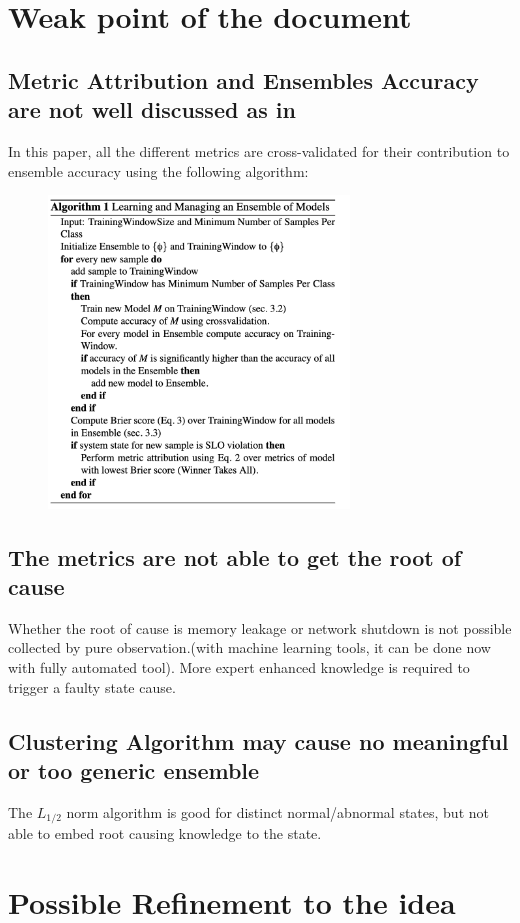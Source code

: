 \documentclass[acmlarge]{acmart}
\begin{document}
\section{Weak point of the document}
\subsection{Metric Attribution and Ensembles Accuracy are not well discussed as in \cite{zhang2005ensembles}}
In this paper, all the different metrics are cross-validated for their contribution to ensemble accuracy using the following algorithm:

\begin{figure}[htbp]
  \centering
  \includegraphics[width=8cm]{./cross_validate.png}
\end{figure}
\subsection{The metrics are not able to get the root of cause}
Whether the root of cause is memory leakage or network shutdown is not possible collected by pure observation.(with machine learning tools, it can be done now with fully automated tool). More expert enhanced knowledge is required to trigger a faulty state cause.
\subsection{Clustering Algorithm may cause no meaningful or too generic ensemble}
The $L_{1/2}$ norm algorithm is good for distinct normal/abnormal states, but not able to embed root causing knowledge to the state.
\section{Possible Refinement to the idea}
\end{document}
